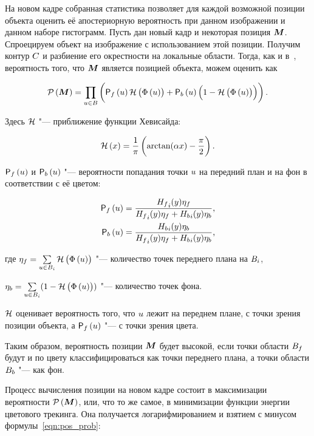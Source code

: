 На новом кадре собранная статистика позволяет для каждой возможной позиции
объекта оценить её апостериорную вероятность при данном изображении и данном
наборе гистограмм.
Пусть дан новый кадр и некоторая позиция $\bm{M}$.
Спроецируем объект на изображение с использованием этой позиции.
Получим контур $C$ и разбиение его окрестности на локальные области.
Тогда, как и в~\cite{Hexner2016}, вероятность того, что $\bm{M}$ является
позицией
объекта, можем оценить как

\begin{equation}
\label{eqn:pos_prob}
    \mathcal{P} \left( \bm{M} \right)  = \prod\limits_{\mathnormal{u} \in B} \left(
        \mathsf{P}_f \left( \mathnormal{u} \right) \mathcal{H} \left( \Phi \left( \mathnormal{u} \right) \right)
        + \mathsf{P}_b \left( \mathnormal{u} \right) \left( 1 - \mathcal{H} \left( \Phi \left( \mathnormal{u} \right) \right) \right)
    \right)
\text{.}
\end{equation}

Здесь $\mathcal{H}$ "--- приближение функции Хевисайда:

\begin{equation}
\label{eqn:heaviside}
    \mathcal{H} \left( x \right) = \frac{1}{\pi} \left( \arctan(\alpha x) - \frac{\pi}{2} \right)
\text{.}
\end{equation}

$\mathsf{P}_f \left( \mathnormal{u} \right)$ и $\mathsf{P}_b \left( \mathnormal{u} \right)$ "--- вероятности попадания точки $\mathnormal{u}$ на
передний план и
на фон в соответствии с её цветом:

\begin{align}
\label{eqn:Pfu}
    \mathsf{P}_f \left( \mathnormal{u} \right) &= \frac{{H_f}_i(y)\eta_f}{{H_f}_i(y)\eta_f +
        {H_b}_i(y)\eta_b} \text{,} \\
    \mathsf{P}_b \left( \mathnormal{u} \right) &=\frac{{H_b}_i(y)\eta_b}{{H_f}_i(y)\eta_f +
        {H_b}_i(y)\eta_b} \text{,}
\end{align}

где
$
    \eta_f = \sum\limits_{\mathnormal{u} \in B_i}\mathcal{H} \left( \Phi \left( \mathnormal{u} \right) \right)
$ "--- количество точек переднего плана на $B_i$,

$
    \eta_b = \sum\limits_{\mathnormal{u} \in B_i}(1 - \mathcal{H} \left( \Phi \left( \mathnormal{u} \right) \right))
$ "--- количество точек фона.

$\mathcal{H}$ оценивает вероятность того, что $\mathnormal{u}$ лежит на переднем плане, с точки
зрения позиции объекта, а $\mathsf{P}_f \left( \mathnormal{u} \right)$ "--- с точки зрения цвета.

Таким образом, вероятность позиции $\bm{M}$ будет высокой, если точки области
$B_f$ будут и по цвету классифицироваться как точки переднего плана, а
точки области $B_b$ "--- как фон.

Процесс вычисления позиции на новом кадре состоит в максимизации вероятности $
\mathcal{P} \left( \bm{M} \right) $, или, что то же самое, в минимизации функции энергии
цветового трекинга.
Она получается логарифмированием и взятием с
минусом
формулы~\ref{eqn:pos_prob}:


